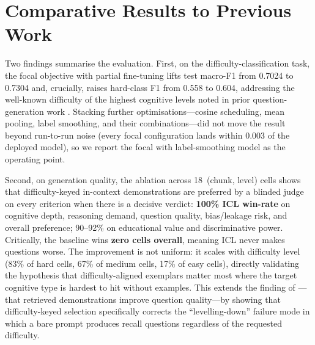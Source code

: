 \documentclass[12pt,a4paper]{report}
\begin{document}
\section{Comparative Results to Previous Work}
Two findings summarise the evaluation. First, on the difficulty-classification
task, the focal objective with partial fine-tuning lifts test macro-F1 from
0.7024 to 0.7304 and, crucially, raises hard-class F1 from 0.558 to 0.604,
addressing the well-known difficulty of the highest cognitive levels noted in
prior question-generation work \parencite{scaria2024aeqg}. Stacking further
optimisations---cosine scheduling, mean pooling, label smoothing, and their
combinations---did not move the result beyond run-to-run noise (every focal
configuration lands within 0.003 of the deployed model), so we report the focal
with label-smoothing model as the operating point.

Second, on generation quality, the ablation across 18~(chunk, level) cells shows
that difficulty-keyed in-context demonstrations are preferred by a blinded judge
on every criterion when there is a decisive verdict: \textbf{100\% ICL win-rate}
on cognitive depth, reasoning demand, question quality, bias/leakage risk, and
overall preference; 90--92\% on educational value and discriminative power.
Critically, the baseline wins \textbf{zero cells overall}, meaning ICL never
makes questions worse. The improvement is not uniform: it scales with difficulty
level (83\% of hard cells, 67\% of medium cells, 17\% of easy cells), directly
validating the hypothesis that difficulty-aligned exemplars matter most where
the target cognitive type is hardest to hit without examples. This extends the
finding of \textcite{maity2025icl}---that retrieved demonstrations improve
question quality---by showing that difficulty-keyed selection specifically
corrects the ``levelling-down'' failure mode in which a bare prompt produces
recall questions regardless of the requested difficulty.

\printbibliography[title=References]
\end{document}
